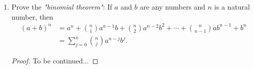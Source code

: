 \begin{exercise}[\textbf{3}]
\begin{enumerate}
         \item Prove the \emph{"binomial theorem"}: If $a$ and $b$ are any
         numbers and $n$ is a natural number, then 
         \begin{align*}
             (a+b)^n &= a^n+\binom{n}{1}a^{n-1}b+\binom{n}{2}a^{n-2}b^2 +\dotsb +\binom{n}{n-1}ab^{n-1}+b^n \\
             &= \sum \limits_{j=0}^{n}\binom{n}{j}a^{n-j}b^j.
         \end{align*}
         \begin{proof}
              To be continued...
         \end{proof}
         \end{enumerate}
\end{exercise}
